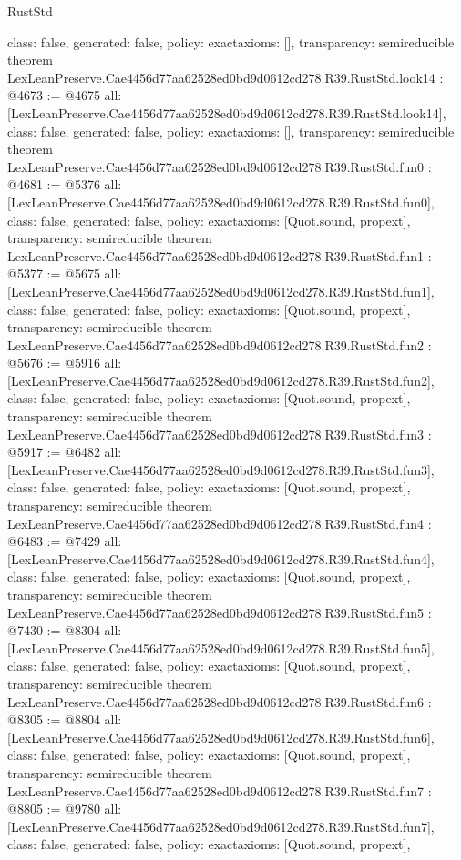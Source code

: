 \begin{lexlean}{RustStd}
\begin{coremodule}
{  class: false,
  generated: false,
  policy: exact{axioms: []},
  transparency: semireducible
}
theorem LexLeanPreserve.Cae4456d77aa62528ed0bd9d0612cd278.R39.RustStd.look14 : @4673 := @4675 {
  all: [LexLeanPreserve.Cae4456d77aa62528ed0bd9d0612cd278.R39.RustStd.look14],
  class: false,
  generated: false,
  policy: exact{axioms: []},
  transparency: semireducible
}
theorem LexLeanPreserve.Cae4456d77aa62528ed0bd9d0612cd278.R39.RustStd.fun0 : @4681 := @5376 {
  all: [LexLeanPreserve.Cae4456d77aa62528ed0bd9d0612cd278.R39.RustStd.fun0],
  class: false,
  generated: false,
  policy: exact{axioms: [Quot.sound, propext]},
  transparency: semireducible
}
theorem LexLeanPreserve.Cae4456d77aa62528ed0bd9d0612cd278.R39.RustStd.fun1 : @5377 := @5675 {
  all: [LexLeanPreserve.Cae4456d77aa62528ed0bd9d0612cd278.R39.RustStd.fun1],
  class: false,
  generated: false,
  policy: exact{axioms: [Quot.sound, propext]},
  transparency: semireducible
}
theorem LexLeanPreserve.Cae4456d77aa62528ed0bd9d0612cd278.R39.RustStd.fun2 : @5676 := @5916 {
  all: [LexLeanPreserve.Cae4456d77aa62528ed0bd9d0612cd278.R39.RustStd.fun2],
  class: false,
  generated: false,
  policy: exact{axioms: [Quot.sound, propext]},
  transparency: semireducible
}
theorem LexLeanPreserve.Cae4456d77aa62528ed0bd9d0612cd278.R39.RustStd.fun3 : @5917 := @6482 {
  all: [LexLeanPreserve.Cae4456d77aa62528ed0bd9d0612cd278.R39.RustStd.fun3],
  class: false,
  generated: false,
  policy: exact{axioms: [Quot.sound, propext]},
  transparency: semireducible
}
theorem LexLeanPreserve.Cae4456d77aa62528ed0bd9d0612cd278.R39.RustStd.fun4 : @6483 := @7429 {
  all: [LexLeanPreserve.Cae4456d77aa62528ed0bd9d0612cd278.R39.RustStd.fun4],
  class: false,
  generated: false,
  policy: exact{axioms: [Quot.sound, propext]},
  transparency: semireducible
}
theorem LexLeanPreserve.Cae4456d77aa62528ed0bd9d0612cd278.R39.RustStd.fun5 : @7430 := @8304 {
  all: [LexLeanPreserve.Cae4456d77aa62528ed0bd9d0612cd278.R39.RustStd.fun5],
  class: false,
  generated: false,
  policy: exact{axioms: [Quot.sound, propext]},
  transparency: semireducible
}
theorem LexLeanPreserve.Cae4456d77aa62528ed0bd9d0612cd278.R39.RustStd.fun6 : @8305 := @8804 {
  all: [LexLeanPreserve.Cae4456d77aa62528ed0bd9d0612cd278.R39.RustStd.fun6],
  class: false,
  generated: false,
  policy: exact{axioms: [Quot.sound, propext]},
  transparency: semireducible
}
theorem LexLeanPreserve.Cae4456d77aa62528ed0bd9d0612cd278.R39.RustStd.fun7 : @8805 := @9780 {
  all: [LexLeanPreserve.Cae4456d77aa62528ed0bd9d0612cd278.R39.RustStd.fun7],
  class: false,
  generated: false,
  policy: exact{axioms: [Quot.sound, propext]},
}
\end{coremodule}
\end{lexlean}
